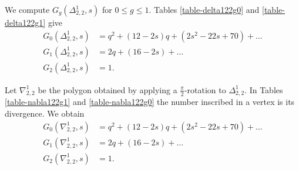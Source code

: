\begin{exam} \label{ex-delta122}
We compute $G_g(\Delta^1_{2,2},s)$ for $0\leqslant g\leqslant 1$. Tables \ref{table-delta122g0} and \ref{table-delta122g1} give
\begin{align*}
    G_0(\Delta^1_{2,2},s) &= q^2 + (12-2s)q + (2s^2-22s+70) + \dots  \\
    G_1(\Delta^1_{2,2},s) &= 2q + (16-2s) + \dots \\
    G_2(\Delta^1_{2,2},s) &= 1.
\end{align*} 
\end{exam}


\begin{exam} \label{ex-nabla122} 
Let $\nabla^1_{2,2}$ be the polygon obtained by applying a $\frac{\pi}{2}$-rotation to $\Delta^1_{2,2}$. In Tables \ref{table-nabla122g1} and \ref{table-nabla122g0} the number inscribed in a vertex is its divergence. We obtain
\begin{align*}
    G_0(\nabla^1_{2,2},s) &= q^2 + (12-2s)q + (2s^2-22s+70) + \dots \\
    G_1(\nabla^1_{2,2},s) &= 2q + (16-2s) + \dots \\
    G_2(\nabla^1_{2,2},s) &= 1. 
\end{align*}
\end{exam}



